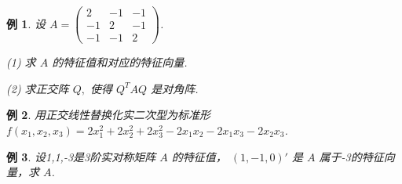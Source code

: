 \documentclass[13pt]{beamer}
\newtheorem{exa}{例}
\begin{document}
	\setcounter{exa}{0}

\begin{frame}
\begin{exa}
设 $A=\left(\begin{array}{ccc}2 & -1 & -1 \\ -1 & 2 & -1 \\ -1 & -1 & 2\end{array}\right)$.

(1) 求 $A$ 的特征值和对应的特征向量.

(2) 求正交阵 $Q,$ 使得 $Q^{T} A Q$ 是对角阵.
\end{exa}

\begin{exa}
 用正交线性替换化实二次型为标准形 $f\left(x_{1}, x_{2}, x_{3}\right)=2 x_{1}^{2}+2 x_{2}^{2}+2 x_{3}^{2}-2 x_{1} x_{2}-2 x_{1} x_{3}-2 x_{2} x_{3}$.
\end{exa}
\end{frame}

\begin{frame}
\begin{exa}
	设1,1,-3是3阶实对称矩阵 $A$ 的特征值，  $(1,-1,0)'$ 是 $A$ 属于-3的特征向量，求 $A$.
\end{exa}
\end{frame}
\end{document}
